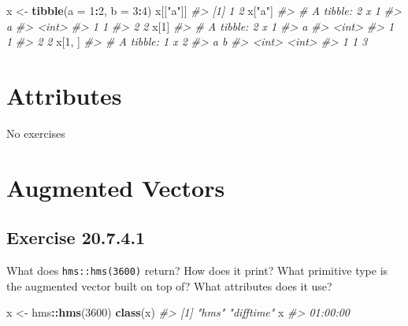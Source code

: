 \documentclass[]{book}
\newenvironment{Shaded}{\begin{snugshade}}{\end{snugshade}}
\newcommand{\CommentTok}[1]{\textcolor[rgb]{0.56,0.35,0.01}{\textit{#1}}}
\newcommand{\DataTypeTok}[1]{\textcolor[rgb]{0.13,0.29,0.53}{#1}}
\newcommand{\DecValTok}[1]{\textcolor[rgb]{0.00,0.00,0.81}{#1}}
\newcommand{\KeywordTok}[1]{\textcolor[rgb]{0.13,0.29,0.53}{\textbf{#1}}}
\newcommand{\NormalTok}[1]{#1}
\newcommand{\OperatorTok}[1]{\textcolor[rgb]{0.81,0.36,0.00}{\textbf{#1}}}
\newcommand{\StringTok}[1]{\textcolor[rgb]{0.31,0.60,0.02}{#1}}
\theoremstyle{plain}
\theoremstyle{remark}
\begin{document}
\begin{Shaded}
\begin{Highlighting}[]
\NormalTok{x <-}\StringTok{ }\KeywordTok{tibble}\NormalTok{(}\DataTypeTok{a =} \DecValTok{1}\OperatorTok{:}\DecValTok{2}\NormalTok{, }\DataTypeTok{b =} \DecValTok{3}\OperatorTok{:}\DecValTok{4}\NormalTok{)}
\NormalTok{x[[}\StringTok{"a"}\NormalTok{]]}
\CommentTok{#> [1] 1 2}
\NormalTok{x[}\StringTok{"a"}\NormalTok{]}
\CommentTok{#> # A tibble: 2 x 1}
\CommentTok{#>       a}
\CommentTok{#>   <int>}
\CommentTok{#> 1     1}
\CommentTok{#> 2     2}
\NormalTok{x[}\DecValTok{1}\NormalTok{]}
\CommentTok{#> # A tibble: 2 x 1}
\CommentTok{#>       a}
\CommentTok{#>   <int>}
\CommentTok{#> 1     1}
\CommentTok{#> 2     2}
\NormalTok{x[}\DecValTok{1}\NormalTok{, ]}
\CommentTok{#> # A tibble: 1 x 2}
\CommentTok{#>       a     b}
\CommentTok{#>   <int> <int>}
\CommentTok{#> 1     1     3}
\end{Highlighting}
\end{Shaded}

\hypertarget{attributes}{%
\section{Attributes}\label{attributes}}

No exercises

\hypertarget{augmented-vectors}{%
\section{Augmented Vectors}\label{augmented-vectors}}

\hypertarget{exercise-20.7.4.1}{%
\subsection*{\texorpdfstring{Exercise {20.7.4.1}}{Exercise 20.7.4.1}}\label{exercise-20.7.4.1}}

What does \texttt{hms::hms(3600)} return? How does it print? What primitive type is the augmented vector built on top of? What attributes does it use?

\begin{Shaded}
\begin{Highlighting}[]
\NormalTok{x <-}\StringTok{ }\NormalTok{hms}\OperatorTok{::}\KeywordTok{hms}\NormalTok{(}\DecValTok{3600}\NormalTok{)}
\KeywordTok{class}\NormalTok{(x)}
\CommentTok{#> [1] "hms"      "difftime"}
\NormalTok{x}
\CommentTok{#> 01:00:00}
\end{Highlighting}
\end{Shaded}
\end{document}
